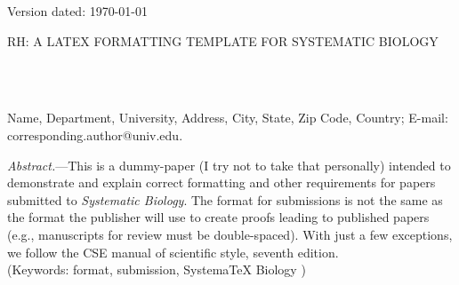 \documentclass[12pt,letterpaper]{article}
\renewcommand{\subsubsection}[1]{%
\vspace{2ex}
\noindent
\textit{#1.}---}
\begin{document}
\begin{flushright}
Version dated: \today
\end{flushright}
\bigskip
\noindent RH:  A LATEX FORMATTING TEMPLATE FOR SYSTEMATIC
  BIOLOGY

\bigskip
\medskip
\begin{center}

\bigskip




\\
\\
\end{center}
\medskip
{} Name, Department, University, Address,
City, State, Zip Code, Country; E-mail: corresponding.author@univ.edu.\\


\vspace{1in}

\subsubsection{Abstract}This is a dummy-paper (I try not to take that
personally) intended to demonstrate and explain correct formatting and
other requirements for papers submitted to {\it Systematic
  Biology}. The format for submissions is not the same as the format
the publisher will use to create proofs leading to published papers
(e.g., manuscripts for review must be double-spaced). With just a few
exceptions, we follow the CSE manual of scientific style, seventh edition. \\
\noindent (Keywords: format, submission, SystemaTeX Biology )\\
\end{document}
